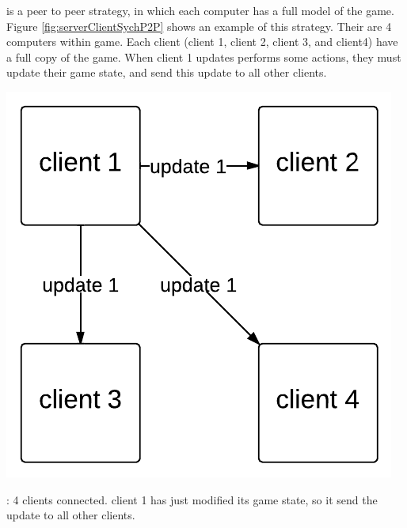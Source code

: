 \emph{\stepOneName} is a peer to peer strategy, in which each computer has a full model of the game. Figure \ref{fig:serverClientSychP2P} shows an example of this strategy. 
Their are 4 computers within game. Each client (client 1, client 2, client 3, and client4) have a full copy of the game.
When client 1 updates performs some actions, they must update their game state, and send this update to all other clients.

\begin{marginfigure}
	\includegraphics{res/computer_communication_architecture/ServerClientSynchronizationP2P.pdf}
	\caption{
	\stepOneName : 4 clients connected. client 1 has just modified its game state, so it send the update to all other clients.
	}
	\label{fig:serverClientSychP2P}
\end{marginfigure}

